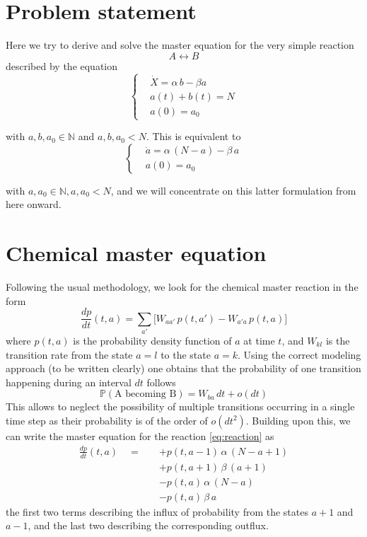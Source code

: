 \documentclass{article}
\newcommand{\red}[1]{{\color{red}#1}}
\begin{document}
	\section{Problem statement}
	Here we try to derive and solve the master equation for the very simple
	reaction
	\begin{equation}\label{eq:reaction}
		A \longleftrightarrow B
	\end{equation}
	described by the equation
	\begin{equation}
		\left\{\begin{aligned}
			&\dot{X} = \alpha \, b - \beta a\\
			&a(t) + b(t) = N\\
			&a(0) = a_0
		\end{aligned}\right.
	\end{equation}

	with $a,b, a_0 \in \mathbb{N}$ and $a,b, a_0 < N$. This is equivalent to 
	\begin{equation}
		\left\{\begin{aligned}
			&\dot{a} = \alpha \, (N-a) - \beta \,a\\
			&a(0) = a_0
		\end{aligned}\right.
	\end{equation}

	with $a, a_0 \in \mathbb{N}, a, a_0 < N$, and we will concentrate on this latter formulation from
	here onward.

	\section{Chemical master equation}
	Following the usual methodology, we look for the chemical master reaction in
	the form
	\begin{equation*}
		\frac{dp}{dt}(t,a) = \sum_{a'} \Big[W_{aa'} \, p(t, a') - W_{a'a} \, p(t,
		a)\Big]
	\end{equation*}
	where $p(t,a)$ is the probability density function of $a$ at time $t$, and
	$W_{kl}$ is the transition rate from the state $a = l$ to the state $a=k$.
	Using the correct modeling approach \red{(to be written clearly)} one obtains that
	the probability of one transition happening during an interval $dt$ follows
	$$
		\mathbb{P}(\text{A becoming B}) = W_{ba} \, dt + o(dt)
	$$
	This allows to neglect the possibility of multiple transitions occurring in a
	single time step as their probability is of the order of $o(dt^2)$.
	Building upon this, we can write the master equation for the reaction
	\eqref{eq:reaction} as 
	\begin{equation}\label{eq:mastereq}
		\begin{aligned}
		\frac{dp}{dt}(t,a) \quad = \quad & + p(t, a-1) \, \alpha \, (N - a + 1)\\
		& + p(t, a+1) \, \beta \, (a+1)\\[6pt]
		& - p(t,a) \, \alpha \, (N-a) \\[6pt]
		& - p(t,a) \, \beta \, a
		\end{aligned}
	\end{equation}
	the first two terms describing the influx of probability from the states
	$a+1$ and $a-1$, and the last two describing the corresponding outflux.
\end{document}
